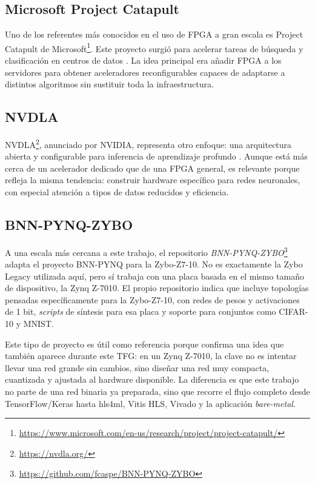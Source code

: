 \subsection{Microsoft Project Catapult}
Uno de los referentes más conocidos en el uso de \ac{FPGA} a gran escala es Project Catapult de
Microsoft\footnote{\url{https://www.microsoft.com/en-us/research/project/project-catapult/}}.
Este proyecto surgió para acelerar tareas de búsqueda y
clasificación en centros de datos \citep{putnam2014a}.
La idea principal era añadir \ac{FPGA} a los servidores para obtener aceleradores reconfigurables
capaces de adaptarse a distintos algoritmos sin sustituir toda la infraestructura.

\subsection{NVDLA}
NVDLA\footnote{\url{https://nvdla.org/}}, anunciado por NVIDIA, representa otro enfoque:
una arquitectura abierta y configurable para
inferencia de aprendizaje profundo \citep{nvdlaDocumentation}.
Aunque está más cerca de un acelerador dedicado que de una \ac{FPGA}
general, es relevante porque refleja la misma tendencia: construir hardware específico para redes
neuronales, con especial atención a tipos de datos reducidos y eficiencia.

\subsection{BNN-PYNQ-ZYBO}
A una escala más cercana a este trabajo, el repositorio
\textit{BNN-PYNQ-ZYBO}\footnote{\url{https://github.com/fcaspe/BNN-PYNQ-ZYBO}} adapta el proyecto
BNN-PYNQ \citep{finn} para la Zybo-Z7-10. No es exactamente la Zybo Legacy utilizada aquí, pero
sí trabaja con
una placa basada en el mismo tamaño de dispositivo, la Zynq Z-7010. El propio repositorio indica que
incluye topologías pensadas específicamente para la Zybo-Z7-10, con redes de pesos y
activaciones de 1 bit, \textit{scripts} de síntesis para esa placa y soporte para
conjuntos como \ac{CIFAR}-10 y
\ac{MNIST}.

Este tipo de proyecto es útil como referencia porque confirma una idea que también aparece durante
este TFG: en un Zynq Z-7010, la clave no es intentar llevar una red grande sin cambios, sino diseñar
una red muy compacta, cuantizada y ajustada al hardware disponible. La diferencia es que este
trabajo no parte de una red binaria ya preparada, sino que recorre el flujo completo desde
TensorFlow/Keras hasta hls4ml, Vitis \ac{HLS}, Vivado y la aplicación \textit{bare-metal}.
